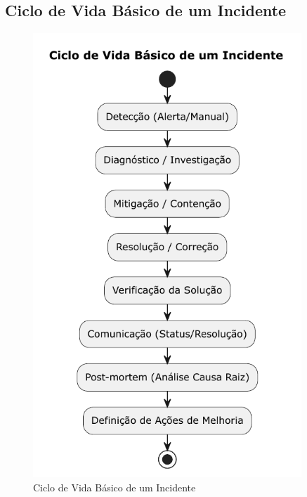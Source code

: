 \subsection{Ciclo de Vida Básico de um Incidente}
\label{subsec:ciclo-incidente}

\begin{figure}[htbp]
    \centering
    \includegraphics[width=0.9\textwidth]{assets/diagrama-ciclo-incidente.pdf}
    \caption{Ciclo de Vida Básico de um Incidente}
    \label{fig:ciclo-incidente}
\end{figure}

